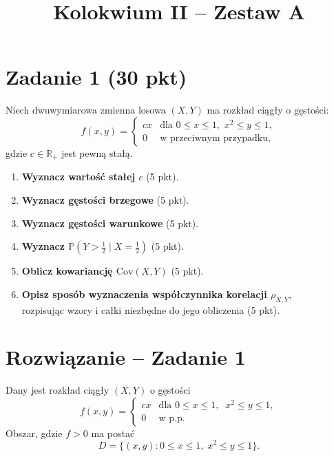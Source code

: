 \documentclass[polish, 10pt]{extarticle}
\begin{document}
\title{Kolokwium II -- Zestaw A}
\author{}
\date{}

\maketitle
\vspace{-2cm}

\section*{Zadanie 1 (30 pkt)}
Niech dwuwymiarowa zmienna losowa $(X, Y)$ ma rozkład ciągły o gęstości:
\[
f(x,y) = 
\begin{cases} 
cx & \text{dla } 0 \le x \le 1, \,\, x^2 \le y \le 1, \\
0 & \text{w przeciwnym przypadku,}
\end{cases}
\]
gdzie $c \in \mathbb{R_+}$ jest pewną stałą.

\begin{enumerate}
    \item[a)] \textbf{Wyznacz wartość stałej $c$} \hfill (5 pkt).
    \item[b)] \textbf{Wyznacz gęstości brzegowe} \hfill (5 pkt).
    \item[c)] \textbf{Wyznacz gęstości warunkowe} \hfill (5 pkt).
    \item[d)] \textbf{Wyznacz $\mathbb P\!\left(Y>\tfrac12\mid X=\tfrac12\right)$} \hfill (5 pkt).
    \item[e)] \textbf{Oblicz kowariancję $\text{Cov}(X, Y)$} \hfill (5 pkt).
    \item[f)] \textbf{Opisz sposób wyznaczenia współczynnika korelacji $\rho_{X,Y}$},\\rozpisując wzory i całki niezbędne do jego obliczenia \hfill (5 pkt).
\end{enumerate}

\section*{Rozwiązanie -- Zadanie 1}

Dany jest rozkład ciągły $(X,Y)$ o gęstości
\[
f(x,y)=
\begin{cases}
cx & \text{dla } 0\le x\le 1,\;\; x^2\le y\le 1,\\
0 & \text{w p.p.}
\end{cases}
\]
Obszar, gdzie $f>0$ ma postać
\[
D=\{(x,y): 0\le x\le 1,\; x^2\le y\le 1\}.
\]
\end{document}
